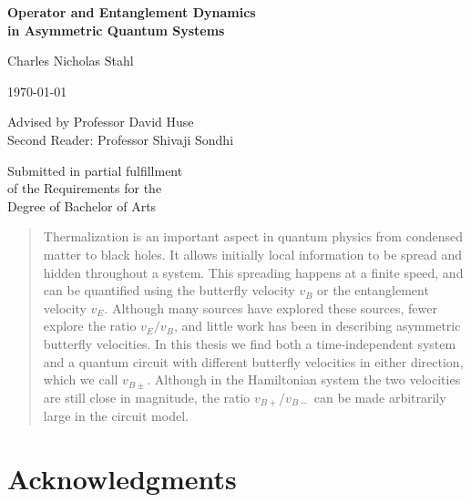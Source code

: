{
\vspace*{.2in}
\begin{center}
	\huge{\textbf{Operator and Entanglement Dynamics \\
			        in Asymmetric Quantum Systems}}
\end{center}
\vspace{.6in}
\sc
\begin{center}
	\LARGE{Charles Nicholas Stahl}
\end{center}
\vspace{.6in}
\begin{center}
\today
\end{center}
\vspace{.6in}
\begin{center}
	{\Large Advised by Professor David Huse} \\
	Second Reader: Professor Shivaji Sondhi
\end{center}
\vspace{.6in}
\begin{center}
	Submitted in partial fulfillment \\
	of the Requirements for the \\
	Degree of Bachelor of Arts
\end{center}
}
\newpage

\begin{abstract}
	Thermalization is an important aspect in quantum physics from condensed matter to black holes. It allows initially local information to be spread and hidden throughout a system. This spreading happens at a finite speed, and can be quantified using the butterfly velocity $v_B$ or the entanglement velocity $v_E$. Although many sources have explored these sources, fewer explore the ratio $v_E/v_B$, and little work has been in describing asymmetric butterfly velocities. In this thesis we find both a time-independent system and a quantum circuit with different butterfly velocities in either direction, which we call $v_{B\pm}$. Although in the Hamiltonian system the two velocities are still close in magnitude, the ratio $v_{B+}/v_{B-}$ can be made arbitrarily large in the circuit model.
\end{abstract}

\newpage

\section*{Acknowledgments}

